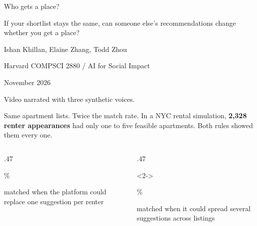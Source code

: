 \documentclass[aspectratio=169,14pt]{beamer}
\begin{document}
\begin{frame}[plain]
\vspace{3mm}
{\fontsize{29}{33}\selectfont Who gets a place?\par}
\bigskip
{\large If your shortlist stays the same, can someone else's recommendations change whether you get a place?\par}
\bigskip
Ishan Khillan, Elaine Zhang, Todd Zhou\par
{\small Harvard COMPSCI 2880 / AI for Social Impact\par}
\vfill
{\small November 2026\par}
{\fontsize{8}{10}\selectfont\color{muted}Video narrated with three synthetic voices.}
\end{frame}

\begin{frame}{Same apartment lists. Twice the match rate.}
In a NYC rental simulation, \textbf{2,328 renter appearances} had only one to five feasible apartments. Both rules showed them every one.
\medskip
\begin{columns}[T,onlytextwidth]
\begin{column}{.47\textwidth}
{\fontsize{34}{38}\selectfont\unchangedBefore\%\par}
matched when the platform could replace one suggestion per renter
\end{column}
\begin{column}{.47\textwidth}
\begin{visibleenv}<2->
{\fontsize{34}{38}\selectfont\color{blue}\unchangedAfter\%\par}
matched when it could spread several suggestions across listings
\end{visibleenv}
\end{column}
\end{columns}
\medskip
{}
\end{frame}
\end{document}
